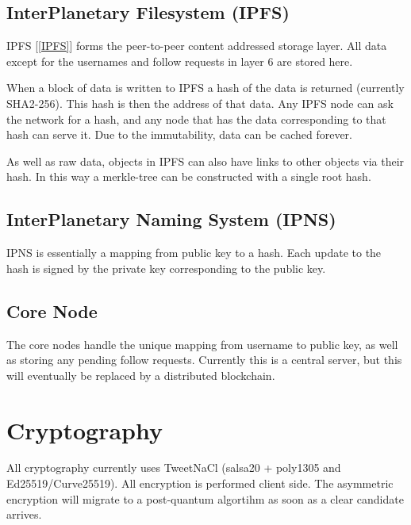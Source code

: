 \documentclass[12pt]{article}
\begin{document}
\subsection*{InterPlanetary Filesystem (IPFS)}
IPFS [\ref{IPFS}] forms the peer-to-peer content addressed storage layer. All data except for the usernames and follow requests in layer 6 are stored here. 


When a block of data is written to IPFS a hash of the data is returned (currently SHA2-256). This hash is then the address of that data. Any IPFS node can ask the network for a hash, and any node that has the data corresponding to that hash can serve it. Due to the immutability, data can be cached forever. 

As well as raw data, objects in IPFS can also have links to other objects via their hash. In this way a merkle-tree can be constructed with a single root hash. 

\subsection*{InterPlanetary Naming System (IPNS)}
IPNS is essentially a mapping from public key to a hash. Each update to the hash is signed by the private key corresponding to the public key. 


\subsection*{Core Node}
The core nodes handle the unique mapping from username to public key, as well as storing any pending follow requests. Currently this is a central server, but this will eventually be replaced by a distributed blockchain. 


\section*{Cryptography}
All cryptography currently uses TweetNaCl (salsa20 + poly1305 and Ed25519/Curve25519). All encryption is performed client side. The asymmetric encryption will migrate to a post-quantum algortihm as soon as a clear candidate arrives. 

\end{document}

